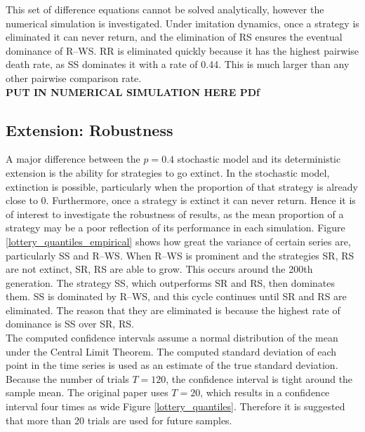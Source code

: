 This set of difference equations cannot be solved analytically, however the numerical simulation is investigated. Under imitation dynamics, once a strategy is eliminated it can never return, and the elimination of RS ensures the eventual dominance of R--WS. RR is eliminated quickly because it has the highest pairwise death rate, as SS dominates it with a rate of 0.44. This is much larger than any other pairwise comparison rate.  \\
\textbf{PUT IN NUMERICAL SIMULATION HERE PDf}

\subsection{Extension: Robustness} 

A major difference between the $p=0.4$ stochastic model and its deterministic extension is the ability for strategies to go extinct. In the stochastic model, extinction is possible, particularly when the proportion of that strategy is already close to 0. Furthermore, once a strategy is extinct it can never return. Hence it is of interest to investigate the robustness of results, as the mean proportion of a strategy may be a poor reflection of its performance in each simulation. 
\FloatBarrier
{}
\FloatBarrier
Figure \ref{lottery_quantiles_empirical} shows how great the variance of certain series are, particularly SS and R--WS. When R--WS is prominent and the strategies SR, RS are not extinct, SR, RS are able to grow. This occurs around the 200th generation. The strategy SS, which outperforms SR and RS, then dominates them. SS is dominated by R--WS, and this cycle continues until SR and RS are eliminated. The reason that they are eliminated is because the highest rate of dominance is SS over SR, RS. \\
\FloatBarrier
{}
\FloatBarrier
 The computed confidence intervals assume a normal distribution of the mean under the Central Limit Theorem. The computed standard deviation of each point in the time series is used as an estimate of the true standard deviation. Because the number of trials $T=120$, the confidence interval is tight around the sample mean. The original paper uses $T=20$, which results in a confidence interval four times as wide Figure \ref{lottery_quantiles}. Therefore it is suggested that more than 20 trials are used for future samples. \\



